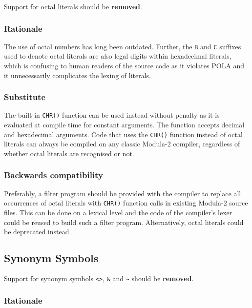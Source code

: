\documentclass[10pt,a4paper]{article}
\begin{document}
Support for octal literals should be \textbf{removed}.

\subsubsection{Rationale}

The use of octal numbers has long been outdated. Further, the \verb|B| and
\verb|C| suffixes used to denote octal literals are also legal digits within
hexadecimal literals, which is confusing to human readers of the source code as
it violates POLA and it unnecessarily complicates the lexing of literals.

\subsubsection{Substitute}

The built-in \verb|CHR()| function can be used instead without penalty as it is
evaluated at compile time for constant arguments. The function accepts decimal
and hexadecimal arguments. Code that uses the \verb|CHR()| function instead of
octal literals can always be compiled on any classic Modula-2 compiler,
regardless of whether octal literals are recognised or not.

\subsubsection{Backwards compatibility}

Preferably, a filter program should be provided with the compiler to replace
all occurrences of octal literals with \verb|CHR()| function calls in existing
Modula-2 source files. This can be done on a lexical level and the code of the
compiler's lexer could be reused to build such a filter program. Alternatively,
octal literals could be deprecated instead.


\subsection{Synonym Symbols}

Support for synonym symbols \verb|<>|, \verb|&| and \verb|~| should be
\textbf{removed}.

\subsubsection{Rationale}
\end{document}
